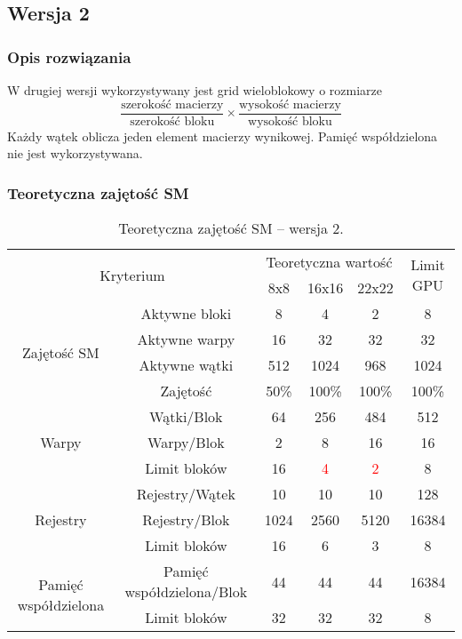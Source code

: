 
\subsection{Wersja 2}

\subsubsection{Opis rozwiązania}

W drugiej wersji wykorzystywany jest grid wieloblokowy o rozmiarze\footnotemark $$\frac{\text{szerokość macierzy}}{\text{szerokość bloku}} \times \frac{\text{wysokość macierzy}}{\text{wysokość bloku}}$$
Każdy wątek oblicza jeden element macierzy wynikowej. Pamięć współdzielona nie jest wykorzystywana.



\subsubsection{Teoretyczna zajętość SM}

\begin{center}
\begin{table}[H]
\centering
\begin{tabular}{|c|c|c|c|c|c|}
\hline
\multicolumn{2}{|c|}{\multirow{2}{*}{Kryterium}} & \multicolumn{3}{c|}{Teoretyczna wartość} & \multirow{2}{*}{Limit GPU} \\ \cline{3-5}
\multicolumn{2}{|c|}{} & 8x8 & 16x16 & 22x22 & \\ \hline
\multirow{4}{*}{Zajętość SM} & Aktywne bloki & 8 & 4 & 2 & 8 \\ \cline{2-6}
& Aktywne warpy & 16 & 32 & 32 & 32 \\ \cline{2-6}
& Aktywne wątki & 512 & 1024 & 968 & 1024 \\ \cline{2-6}
& Zajętość & 50\% & 100\% & 100\% & 100\% \\ \hline
\multirow{3}{*}{Warpy} & Wątki/Blok & 64 & 256 & 484 & 512 \\ \cline{2-6}
& Warpy/Blok & 2 & 8 & 16 & 16 \\ \cline{2-6}
& Limit bloków & 16 & \textcolor{red}{4} & \textcolor{red}{2} & 8 \\ \hline
\multirow{3}{*}{Rejestry} & Rejestry/Wątek & 10 & 10 & 10 & 128 \\ \cline{2-6}
& Rejestry/Blok & 1024 & 2560 & 5120 & 16384 \\ \cline{2-6}
& Limit bloków & 16 & 6 & 3 & 8 \\ \hline
\multirow{2}{*}{Pamięć współdzielona} & Pamięć współdzielona/Blok & 44 & 44 & 44 & 16384 \\ \cline{2-6}
& Limit bloków & 32 & 32 & 32 & 8 \\ \hline
\end{tabular}
\caption{Teoretyczna zajętość SM -- wersja 2.}
\end{table}
\end{center}

